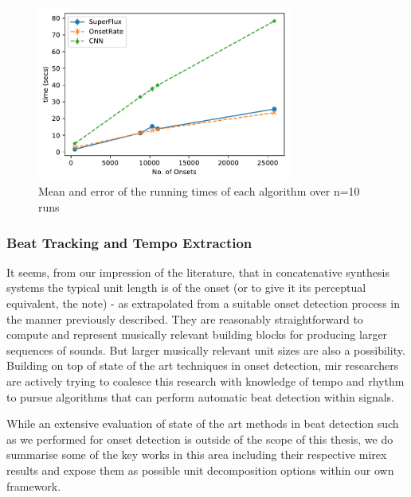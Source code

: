{\begin{figure}
	\begin{center}
		\includegraphics[width=0.75\textwidth]{ch05_pyconcat/figures/onset_running_times.pdf}
	\end{center}
	\caption[Mean and error of the running times of each algorithm over n=10 runs]{Mean and error of the running times of each algorithm over n=10 runs}
	\label{fig:onset_running_times}
\end{figure}

\subsubsection{Beat Tracking and Tempo Extraction}

It seems, from our impression of the literature, that in concatenative synthesis systems the typical unit length is of the onset (or to give it its perceptual equivalent, the note)  \citep{Schwarz2006, Frisson2010, Bernardes2013} - as extrapolated from a suitable onset detection process in the manner previously described. They are reasonably straightforward to compute and represent musically relevant building blocks for producing larger sequences of sounds. But larger musically relevant unit sizes are also a possibility.  Building on top of state of the art techniques in onset detection, \acrshort{mir} researchers are actively trying to coalesce this research with knowledge of tempo and rhythm to pursue algorithms that can perform automatic beat detection within signals.

While an extensive evaluation of state of the art methods in beat detection such as we performed for onset detection is outside of the scope of this thesis, we do summarise some of the key works in this area including their respective \acrshort{mirex} results and expose them as possible unit decomposition options within our own framework. 

}

